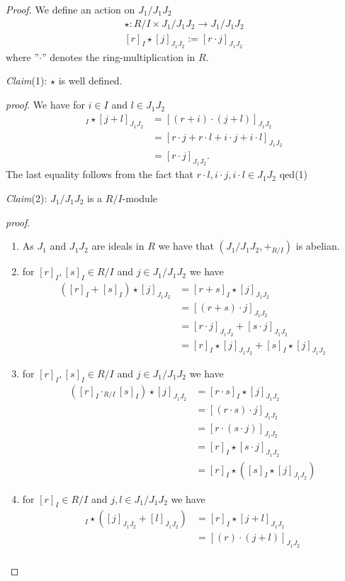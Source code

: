 \documentclass{article}
\newcommand{\subclaim}[1]
{

	\vspace*{0,2cm}
	\textit{Claim}({#1}):
}
\newcommand{\subqed}[1]{\hfill\textsf{qed}({#1})}
\newcommand{\subproof}{

\noindent\textit{proof}.\hspace{0,1cm}
}
\theoremstyle{definition}
\theoremstyle{plain}
\theoremstyle{remark}
\begin{document}
\begin{proof}
	We define an action on $J_1/J_1J_2$
	\begin{align}
		\star:R/I\times J_1/J_1J_2 \rightarrow J_1/J_1J_2 \\
		[r]_I\star[j]_{J_1J_2} := [r \cdot j]_{J_1J_2}
	\end{align}
	where ''$\cdot$'' denotes the ring-multiplication in $R$.
	\subclaim1 $\star$ is well defined.
	\subproof We have for $i\in I$ and $l\in J_1J_2$
	\begin{align}
		[r+i]_I\star[j+l]_{J_1J_2} &= [(r+i)\cdot (j+l)]_{J_1J_2}\\
					   &= [r\cdot j + r\cdot l + i\cdot j + i\cdot l]_{J_1J_2}\\
					   &= [r\cdot j]_{J_1J_2}.
	\end{align}
	The last equality follows from the fact that $r\cdot l, i\cdot j, i\cdot l \in J_1J_2$ \subqed1
	\subclaim2 $J_1/J_1J_2$ is a $R/I$-module
	\subproof
	\begin{enumerate}
		\item As $J_1$ and $J_1J_2$ are ideals in $R$ we have that $(J_1/J_1J_2,+_{R/I})$ is abelian.
		\item for $[r]_I,[s]_I\in R/I$ and $j\in J_1/J_1J_2$ we have 
			\begin{align}
				([r]_I+[s]_I)\star [j]_{J_1J_2} &= [r+s]_I\star[j]_{J_1J_2} \\
								&= [(r+s)\cdot j]_{J_1J_2} \\
								&= [r\cdot j]_{J_1J_2}+[s\cdot j]_{J_1J_2} \\
								&= [r]_I\star[j]_{J_1J_2}+[s]_I\star[j]_{J_1J_2}
			\end{align}
		\item for $[r]_I,[s]_I\in R/I$ and $j\in J_1/J_1J_2$ we have
			\begin{align}
				([r]_I\cdot_{R/I}[s]_I)\star [j]_{J_1J_2} &= [r\cdot s]_I\star[j]_{J_1J_2} \\
								&= [(r\cdot s)\cdot j]_{J_1J_2} \\
								&= [r\cdot (s\cdot j)]_{J_1J_2} \\
								&= [r]_I\star[s\cdot j]_{J_1J_2}\\
								&= [r]_I\star([s]_I\star [j]_{J_1J_2})
			\end{align}
		\item for $[r]_I\in R/I$ and $j,l\in J_1/J_1J_2$ we have
			\begin{align}
				[r]_I\star ([j]_{J_1J_2}+[l]_{J_1J_2}) &= [r]_I\star[j+l]_{J_1J_2} \\
								       &= [(r)\cdot (j+l)]_{J_1J_2} \\

\end{align}
\end{enumerate}
\end{proof}
\end{document}
